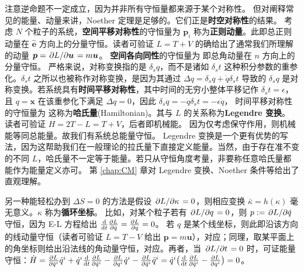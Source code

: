 注意逆命题不一定成立，因为并非所有守恒量都来源于某个对称性。
但对阐释常见的能量、动量来讲，Noether 定理是足够的。它们正是\textbf{时空对称性}的结果。
考虑 $N$ 个粒子的系统，\textbf{空间平移对称性}的守恒量为
$\bm p_i$ 称为\textbf{正则动量}。此即总正则动量在 $\hat{\bm e}$ 方向上的分量守恒。读者可验证 $L=T+V$ 的确给出了通常我们所理解的动量 $\vb* p=\pdv*{L}{\vb* u}=m\vb* u$。
\textbf{空间各向同性}的守恒量为
即总角动量在 $n$ 方向上的分量守恒。
严格来说，对称变换指的是 $\delta_s q$，而不是诸如 $\delta_s t$ 这种积分参数的重参化。$\delta_s t$ 之所以也被称作对称变换，是因为其通过 $\Delta q=\delta_s q+\dot q\delta_s t$ 导致的 $\delta_s q$ 是对称变换。若系统具有\textbf{时间平移对称性}，其中时间的无穷小整体平移记作 $\delta_s t=\epsilon$，且 $q=\bm x$ 在该重参化下满足 $\Delta q=0$，因此 $\delta_s q=-\dot q\delta_s t=-\epsilon\dot q$，
时间平移对称性的守恒量为
这称为\textbf{哈氏量}(Hamiltonian)。其与 $L$ 的关系称为\textbf{Legendre 变换}。
读者可验证 $H=2T-L=T+V$，后者即机械能。
因为仅考虑保守作用，则机械能等同总能量。故我们有系统总能量守恒。
Legendre 变换是一个更有优势的写法，因为这帮助我们在一般理论的拉氏量下直接定义能量。当然，由于存在准不变的不同 $L$，哈氏量不一定等于能量。若只从守恒角度考量，非要称任意哈氏量都能作为能量定义亦可。
第 \ref{chap:CM} 章对 Legendre 变换、Noether 条件等给出了直观理解。

另一种能轻松办到 $\Delta S=0$ 的方法是假设 $\pdv*{L}{\kappa}=0$，则相应变换 $\bar\kappa=h(\kappa)$ 毫无意义。$\kappa$ 称为\textbf{循环坐标}。
比如，对某个粒子若有 $\pdv*{L}{q}=0$，则 $p:=\pdv*{L}{\dot{q}}$ 守恒，因为 E-L 方程给出 $\dv{t} \pdv{L}{\dot q}=\pdv{L}{q}=0$。
若 $q$ 是某个线坐标，则此即沿该方向的线动量守恒（读者可验证 $L=T-V$ 给出 $\bm p=m\bm u$），对应；同理，取某平面上的角坐标则给出沿法线的角动量守恒，对应。再者，当 $\pdv*{L}{t}=0$ 时，可证能量守恒：$\dot H=\pdv{L}{\dot q^i}\ddot q^i+\dot q^i\dv{t}\pdv{L}{\dot q^i}-\pdv{L}{q^i}\dot q^i-\pdv{L}{\dot q^i}\ddot q^i=\dot q^i\big(\dv{t}\pdv{L}{\dot q^i}-\pdv{L}{q^i}\big)=0$。

